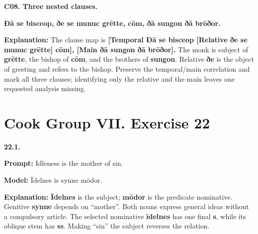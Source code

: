 \par\begin{minipage}{\linewidth}\raggedright
\textbf{C08. Three nested clauses.}

\textbf{Ðā se bisceop, ðe se munuc grētte, cōm, ðā sungon ðā brōðor.}

\textbf{Explanation:} The clause map is \textbf{[Temporal Ðā se bisceop [Relative ðe se munuc grētte] cōm], [Main ðā sungon ðā brōðor].} The monk is subject of \textbf{grētte}, the bishop of \textbf{cōm}, and the brothers of \textbf{sungon}. Relative \textbf{ðe} is the object of greeting and refers to the bishop. Preserve the temporal/\allowbreak{}main correlation and mark all three clauses; identifying only the relative and the main leaves one requested analysis missing.

\end{minipage}\par\addvspace{4pt}

\section*{Cook Group VII. Exercise 22}

\par\begin{minipage}{\linewidth}\raggedright
\textbf{22.1.}

\textbf{Prompt:} Idleness is the mother of sin.

\textbf{Model:} Īdelnes is synne mōdor.

\textbf{Explanation:} \textbf{Īdelnes} is the subject; \textbf{mōdor} is the predicate nominative. Genitive \textbf{synne} depends on “mother”. Both nouns express general ideas without a compulsory article. The selected nominative \textbf{īdelnes} has one final \textbf{s}, while its oblique stem has \textbf{ss}. Making “sin” the subject reverses the relation.

\end{minipage}\par\addvspace{4pt}

